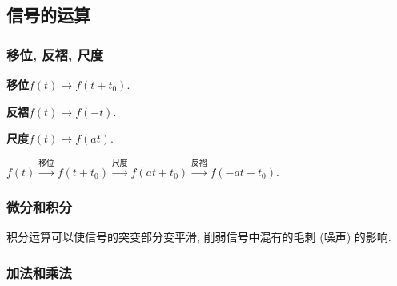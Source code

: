 \subsection{信号的运算}

\subsubsection{移位, 反褶, 尺度}

\textbf{移位}\quad $f(t)\rightarrow f(t+t_0)$.

\textbf{反褶}\quad $f(t)\rightarrow f(-t)$.

\textbf{尺度}\quad $f(t)\rightarrow f(at)$.

$f(t) \xrightarrow{\textrm{移位}} f(t+t_0) \xrightarrow{\textrm{尺度}} f(at+t_0) \xrightarrow{\textrm{反褶}} f(-at+t_0)$.

\subsubsection{微分和积分}

积分运算可以使信号的突变部分变平滑, 削弱信号中混有的毛刺 (噪声) 的影响.

\subsubsection{加法和乘法}
